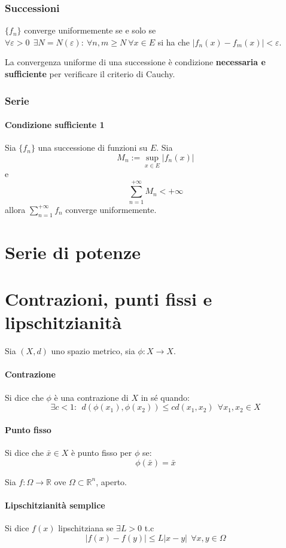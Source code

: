 \documentclass[a4paper,12pt]{article}
\begin{document}
\subsubsection{Successioni}
$\{f_n\}$ converge uniformemente se e solo se $\forall \varepsilon>0\ \ \exists N=N(\varepsilon):\ \forall n,m \geq N\ \forall x\in E$ si ha che $|f_n(x) - f_m(x)| < \varepsilon$.

La convergenza uniforme di una successione è condizione \textbf{necessaria e sufficiente} per verificare il criterio di Cauchy.

\subsubsection{Serie}

\paragraph{Condizione sufficiente 1}
Sia $\{f_n\}$ una successione di funzioni su $E$. Sia $$M_n:= \displaystyle\sup_{x\in E}|f_n(x)|$$ e $$\sum_{n=1}^{+\infty}M_n<+\infty$$
allora $\displaystyle\sum_{n=1}^{+\infty}f_n$ converge uniformemente.

\section{Serie di potenze}

\section{Contrazioni, punti fissi e lipschitzianità}


Sia $(X, d)$ uno spazio metrico, sia $\phi : X\rightarrow X$.
\paragraph{Contrazione}
Si dice che $\phi$ è una contrazione di $X$ in sé quando:
$$\exists c < 1:\ \ d(\phi(x_1), \phi(x_2)) \leq cd(x_1, x_2)\ \ \forall x_1, x_2 \in X$$
\paragraph{Punto fisso}
Si dice che $\bar{x}\in X$ è punto fisso per $\phi$ se:
$$\phi(\bar{x})=\bar{x}$$


Sia $f:\Omega\rightarrow\mathbb{R}$ ove $\Omega\subset\mathbb{R}^n$, aperto.
\paragraph{Lipschitzianità semplice}
Si dice $f\left(x\right)$ lipschitziana se $\exists L>0$ t.c
$$ |f\left(x\right)- f\left(y\right)| \leq L|x-y| \ \ \forall x,y \in \Omega $$
\end{document}
